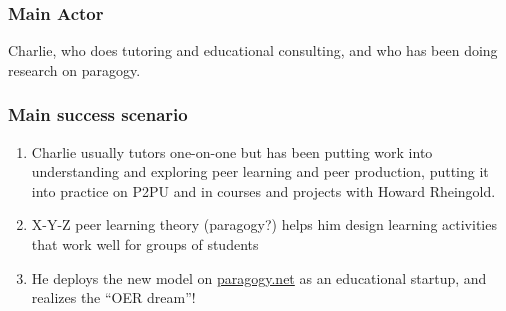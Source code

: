 \subsubsection{Main Actor}

Charlie, who does tutoring and educational consulting, and who has been
doing research on paragogy.

\subsubsection{Main success scenario}

\begin{enumerate}
\item
  Charlie usually tutors one-on-one but has been putting work into
  understanding and exploring peer learning and peer production, putting
  it into practice on P2PU and in courses and projects with Howard
  Rheingold.
\item
  X-Y-Z peer learning theory (paragogy?) helps him design learning
  activities that work well for groups of students
\item
  He deploys the new model on \href{http://paragogy.net}{paragogy.net}
  as an educational startup, and realizes the ``OER dream''!
\end{enumerate}
